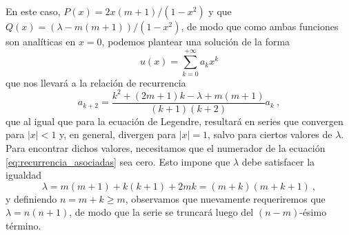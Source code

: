 En este caso, $P(x) = 2x(m+1)/(1-x^2)$ y que $Q(x) = (\lambda - m(m+1))/(1-x^2)$, de modo que como ambas funciones son analíticas en $x=0$, podemos plantear una solución de la forma
\begin{equation}
    u(x) = \sum_{k=0}^{+\infty} a_k x^k 
\end{equation} 
que nos llevará a la relación de recurrencia
\begin{equation}\label{eq:recurrencia_asociadas}
    a_{k+2} = \frac{k^2 + (2m+1)k - \lambda + m(m+1)}{(k+1)(k+2)} a_k \ ,
\end{equation}
que al igual que para la ecuación de Legendre, resultará en series que convergen para $|x|<1$ y, en general, divergen para $|x|=1$, salvo para ciertos valores de $\lambda$. Para encontrar dichos valores, necesitamos que el numerador de la ecuación \eqref{eq:recurrencia_asociadas} sea cero. Esto impone que $\lambda$ debe satisfacer la igualdad
\begin{equation}
    \lambda = m(m+1) + k(k+1) + 2mk = (m+k)(m+k+1) \ ,
\end{equation}
y definiendo $n = m+k \geq m$, observamos que nuevamente requeriremos que $\lambda = n(n+1)$, de modo que la serie se truncará luego del $(n-m)$-ésimo término.

